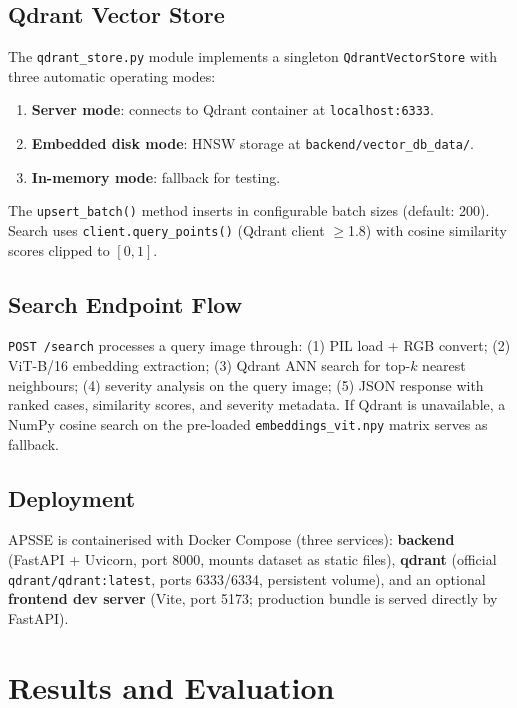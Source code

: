 \documentclass[conference]{IEEEtran}
\begin{document}
\subsection{Qdrant Vector Store}

The \texttt{qdrant\_store.py} module implements a singleton \texttt{QdrantVectorStore} with three automatic operating modes:
\begin{enumerate}[leftmargin=*, label=\arabic*)]
  \item \textbf{Server mode}: connects to Qdrant container at \texttt{localhost:6333}.
  \item \textbf{Embedded disk mode}: HNSW storage at \texttt{backend/vector\_db\_data/}.
  \item \textbf{In-memory mode}: fallback for testing.
\end{enumerate}
The \texttt{upsert\_batch()} method inserts in configurable batch sizes (default: 200). Search uses \texttt{client.query\_points()} (Qdrant client $\geq$1.8) with cosine similarity scores clipped to $[0,1]$.

\subsection{Search Endpoint Flow}

\texttt{POST /search} processes a query image through: (1) PIL load + RGB convert; (2) ViT-B/16 embedding extraction; (3) Qdrant ANN search for top-$k$ nearest neighbours; (4) severity analysis on the query image; (5) JSON response with ranked cases, similarity scores, and severity metadata. If Qdrant is unavailable, a NumPy cosine search on the pre-loaded \texttt{embeddings\_vit.npy} matrix serves as fallback.

\subsection{Deployment}

APSSE is containerised with Docker Compose (three services): \textbf{backend} (FastAPI + Uvicorn, port 8000, mounts dataset as static files), \textbf{qdrant} (official \texttt{qdrant/qdrant:latest}, ports 6333/6334, persistent volume), and an optional \textbf{frontend dev server} (Vite, port 5173; production bundle is served directly by FastAPI).

\section{Results and Evaluation}
\end{document}
